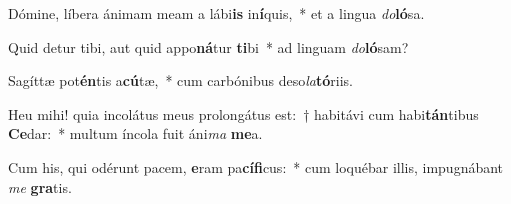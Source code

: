 \item Dómine, líbera ánimam meam a lábi\textbf{is} in\textbf{í}quis,~* et a lingua \textit{do}\textbf{ló}sa.
\item Quid detur tibi, aut quid appo\textbf{ná}tur \textbf{ti}bi~* ad linguam \textit{do}\textbf{ló}sam?
\item Sagíttæ pot\textbf{én}tis a\textbf{cú}tæ,~* cum carbónibus deso\textit{la}\textbf{tó}riis.
\item Heu mihi! quia incolátus meus prolongátus est:~† habitávi cum habi\textbf{tán}tibus \textbf{Ce}dar:~* multum íncola fuit áni\textit{ma} \textbf{me}a.
\item Cum his, qui odérunt pacem, \textbf{e}ram pa\textbf{cí}\textbf{fi}cus:~* cum loquébar illis, impugnábant \textit{me} \textbf{gra}tis.
